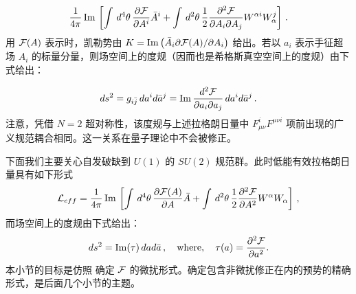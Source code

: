 $$
\frac{1}{4\pi} \, {\rm Im} \, \left [ \int \, d^{4}\theta \,
\frac{\partial {\cal F}}{\partial A^{i}} \bar{A}^{i} +
\int \, d^{2} \theta \, \frac{1}{2}
\frac{\partial^{2}{\cal F}}{\partial A_{i} \partial A_{j}}
W^{\alpha i} W^j_\alpha
\right ]\,.
$$
用 ${\cal F}(A)$ 表示时，凯勒势由 $K={\rm Im}\left(\bar{A}_{i}\partial{\cal F}(A)/\partial A_{i}\right)$ 给出。若以 $a_i$ 表示手征超场 $A_i$ 的标量分量，则场空间上的度规（因而也是希格斯真空空间上的度规）由下式给出：

$$
ds^2 = g_{i\bar{j}}\,da^i d\bar{a}^j =
{\rm Im}\,\frac{d^2{\cal F}}{\partial a_i \partial a_j}
\, da^i d\bar{a}^j \,.
$$
注意，凭借 $N=2$ 超对称性，该度规与上述拉格朗日量中 $F_{\mu\nu}^iF^{\mu\nu i}$ 项前出现的广义规范耦合相同。这一关系在量子理论中不会被修正。


下面我们主要关心自发破缺到 $U(1)$ 的 $SU(2)$ 规范群。此时低能有效拉格朗日量具有如下形式
\begin{equation}
{\cal L}_{eff}=
\frac{1}{4\pi} \, {\rm Im} \, \left [ \int \, d^{4}\theta \,
\frac{\partial {\cal F}(A)}{\partial A} \bar{A} +
\int \, d^{2} \theta \, \frac{1}{2}
\frac{\partial^{2}{\cal F}}{\partial A^{2}} W^{\alpha} W_{\alpha}
\right ]\,, 
\label{EA}
\end{equation}
而场空间上的度规由下式给出：
\begin{equation}
ds^2= {\rm Im}(\tau)\, da d\bar a\,,\quad {\rm where},\quad
\tau (a) = \frac{\partial^{2} {\cal F}}{\partial a^{2}}.
\label{metric}
\end{equation}
本小节的目标是仿照 \cite{Seiberg88} 确定 ${\cal F}$ 的微扰形式。确定包含非微扰修正在内的预势的精确形式，是后面几个小节的主题。

